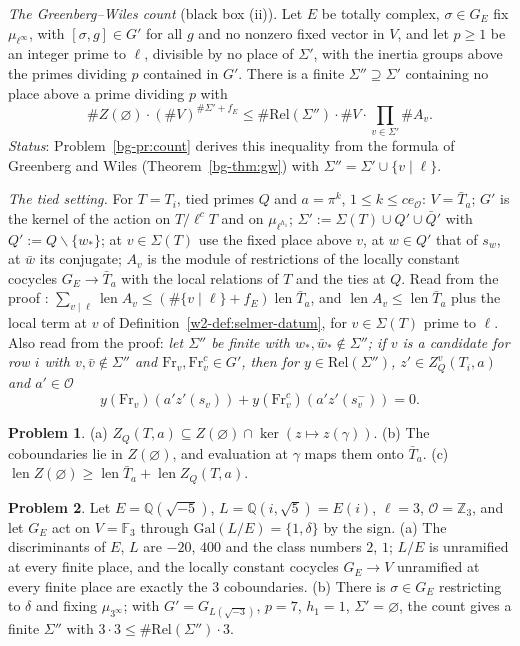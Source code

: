 \documentclass[reqno]{amsart}
\theoremstyle{definition}
\newtheorem{problem}{Problem}[section]
\theoremstyle{plain}
\newcommand{\Z}{\mathbb{Z}}
\newcommand{\Q}{\mathbb{Q}}
\newcommand{\F}{\mathbb{F}}
\newcommand{\Oc}{\mathcal{O}}
\newcommand{\len}{\operatorname{len}}
\newcommand{\Fr}{\mathrm{Fr}}
\newcommand{\Rel}{\mathrm{Rel}}
\begin{document}
\emph{The Greenberg--Wiles count} (black box (ii)).  Let \(E\) be totally complex, \(\sigma \in G_E\) fix \(\mu_{\ell^\infty}\), with \([\sigma, g] \in G'\) for all \(g\) and no nonzero fixed vector in \(V\), and let \(p \ge 1\) be an integer prime to \(\ell\), divisible by no place of \(\Sigma'\), with the inertia groups above the primes dividing \(p\) contained in \(G'\).  There is a finite \(\Sigma'' \supseteq \Sigma'\) containing no place above a prime dividing \(p\) with
\[
  \#Z(\varnothing)\cdot (\#V)^{\#\Sigma' + f_E} \le \#\Rel(\Sigma'')\cdot \#V \cdot \prod_{v \in \Sigma'} \#A_v .
\]
\emph{Status}: Problem~\ref{bg-pr:count} derives this inequality from the formula of Greenberg and Wiles (Theorem~\ref{bg-thm:gw}) with \(\Sigma''=\Sigma'\cup\{v\mid\ell\}\).

\emph{The tied setting.}  For \(T = T_i\), tied primes \(Q\) and \(a = \pi^k\), \(1 \le k \le ce_{\Oc}\): \(V = \bar T_a\); \(G'\) is the kernel of the action on \(T/\ell^cT\) and on \(\mu_{\ell^{h_1}}\); \(\Sigma' := \Sigma(T) \cup Q' \cup \bar Q'\) with \(Q' := Q \smallsetminus \{w_*\}\); at \(v \in \Sigma(T)\) use the fixed place above \(v\), at \(w \in Q'\) that of \(s_w\), at \(\bar w\) its conjugate; \(A_v\) is the module of restrictions of the locally constant cocycles \(G_E \to \bar T_a\) with the local relations of \(T\) and the ties at \(Q\).  Read from the proof \cite{GL}: \(\sum_{v \mid \ell} \len A_v \le (\#\{v \mid \ell\} + f_E)\len \bar T_a\), and \(\len A_v \le \len \bar T_a\) plus the local term at \(v\) of Definition~\ref{w2-def:selmer-datum}, for \(v \in \Sigma(T)\) prime to \(\ell\).  Also read from the proof: \emph{let \(\Sigma''\) be finite with \(w_*, \bar w_* \notin \Sigma''\); if \(v\) is a candidate for row \(i\) with \(v, \bar v \notin \Sigma''\) and \(\Fr_v, \Fr_v^c \in G'\), then for \(y \in \Rel(\Sigma'')\), \(z' \in Z^v_Q(T_i, a)\) and \(a' \in \Oc\)}
\[
  y(\Fr_v)(a'z'(s_v)) + y(\Fr_v^c)(a'z'(s_v^{-})) = 0 .
\]

\begin{problem}\label{pr:coboundaries}
\textup{(a)} \(Z_Q(T, a) \subseteq Z(\varnothing) \cap \ker(z \mapsto z(\gamma))\).  \textup{(b)} The coboundaries lie in \(Z(\varnothing)\), and evaluation at \(\gamma\) maps them onto \(\bar T_a\).  \textup{(c)} \(\len Z(\varnothing) \ge \len \bar T_a + \len Z_Q(T, a)\).
\end{problem}

\begin{problem}\label{pr:count-example}
Let \(E = \Q(\sqrt{-5})\), \(L = \Q(i, \sqrt 5) = E(i)\), \(\ell = 3\), \(\Oc = \Z_3\), and let \(G_E\) act on \(V = \F_3\) through \(\mathrm{Gal}(L/E) = \{1, \delta\}\) by the sign.  \textup{(a)} The discriminants of \(E\), \(L\) are \(-20\), \(400\) and the class numbers \(2\), \(1\); \(L/E\) is unramified at every finite place, and the locally constant cocycles \(G_E \to V\) unramified at every finite place are exactly the \(3\) coboundaries.  \textup{(b)} There is \(\sigma \in G_E\) restricting to \(\delta\) and fixing \(\mu_{3^\infty}\); with \(G' = G_{L(\sqrt{-3})}\), \(p = 7\), \(h_1 = 1\), \(\Sigma' = \varnothing\), the count gives a finite \(\Sigma''\) with \(3 \cdot 3 \le \#\Rel(\Sigma'') \cdot 3\).
\end{problem}
\end{document}
